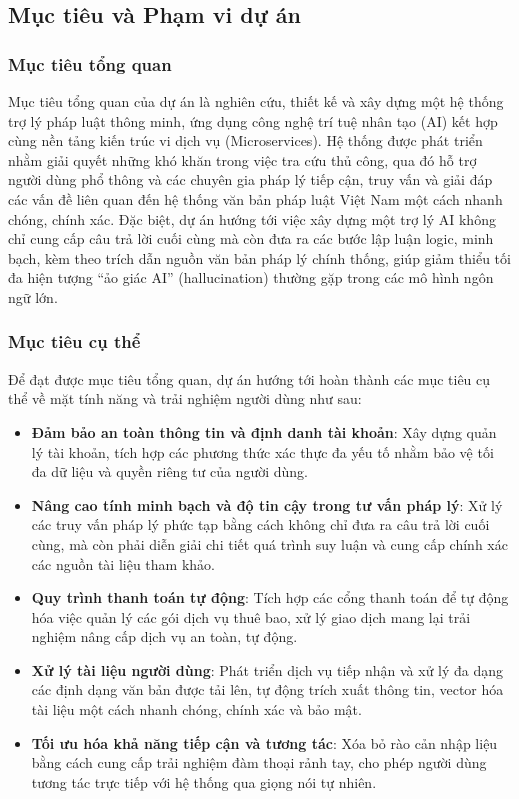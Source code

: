 \subsection{Mục tiêu và Phạm vi dự án}

\subsubsection{Mục tiêu tổng quan}

Mục tiêu tổng quan của dự án
là nghiên cứu, thiết kế và xây dựng
một hệ thống trợ lý pháp luật
thông minh, ứng dụng công nghệ trí tuệ nhân tạo (AI)
kết hợp cùng nền tảng kiến trúc vi dịch vụ (Microservices).
Hệ thống được phát triển nhằm giải quyết
những khó khăn trong việc tra cứu thủ công,
qua đó hỗ trợ người dùng phổ thông và
các chuyên gia pháp lý tiếp cận, truy vấn và
giải đáp các vấn đề liên quan đến
hệ thống văn bản pháp luật
Việt Nam một cách nhanh chóng, chính xác.
Đặc biệt, dự án hướng tới việc xây dựng một trợ lý AI
không chỉ cung cấp câu trả lời cuối cùng
mà còn đưa ra các bước lập luận logic,
minh bạch, kèm theo trích dẫn
nguồn văn bản pháp lý chính thống,
giúp giảm thiểu tối đa hiện tượng \enquote{ảo giác AI} (hallucination) thường gặp trong các mô hình ngôn ngữ lớn.

\subsubsection{Mục tiêu cụ thể}

Để đạt được mục tiêu tổng quan, dự án hướng tới hoàn thành các mục tiêu cụ thể
về mặt tính năng và trải nghiệm người dùng như sau:

\begin{itemize}
\item \textbf{Đảm bảo an toàn thông tin và định danh tài khoản}:
Xây dựng quản lý tài khoản,
tích hợp các phương thức xác thực đa yếu tố
nhằm bảo vệ tối đa dữ liệu
và quyền riêng tư của người dùng.

\item \textbf{Nâng cao tính minh bạch và độ tin cậy trong tư vấn pháp lý}:
Xử lý các truy vấn pháp lý phức tạp
bằng cách không chỉ đưa ra câu trả lời cuối cùng,
mà còn phải diễn giải chi tiết quá trình suy luận
và cung cấp chính xác các nguồn tài liệu tham khảo.

\item \textbf{Quy trình thanh toán tự động}:
Tích hợp các cổng thanh toán
để tự động hóa việc quản lý các gói dịch vụ thuê bao,
xử lý giao dịch
mang lại trải nghiệm nâng cấp dịch vụ an toàn, tự động.

\item \textbf{Xử lý tài liệu người dùng}:
Phát triển dịch vụ tiếp nhận
và xử lý đa dạng các định dạng văn bản được tải lên,
tự động trích xuất thông tin, vector hóa tài liệu
một cách nhanh chóng, chính xác và bảo mật.

\item \textbf{Tối ưu hóa khả năng tiếp cận và tương tác}:
Xóa bỏ rào cản nhập liệu
bằng cách cung cấp trải nghiệm đàm thoại rảnh tay,
cho phép người dùng tương tác trực tiếp với hệ thống qua giọng nói tự nhiên.

\end{itemize}

